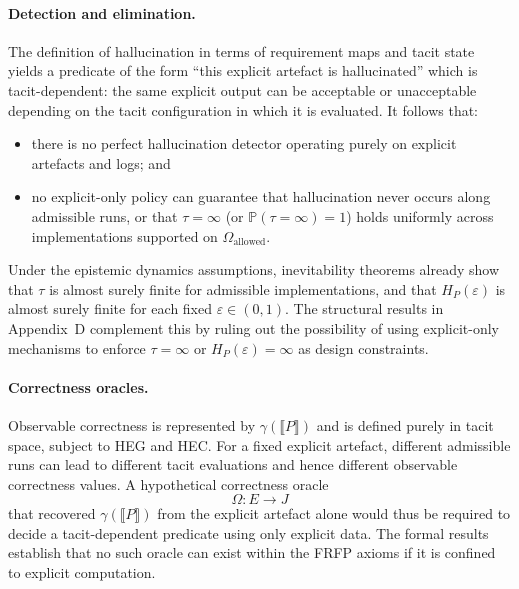\paragraph{Detection and elimination.}
The definition of hallucination in terms of requirement maps and tacit state yields a predicate of the form ``this explicit artefact is hallucinated'' which is tacit-dependent: the same explicit output can be acceptable or unacceptable depending on the tacit configuration in which it is evaluated. It follows that:
\begin{itemize}
  \item there is no perfect hallucination detector operating purely on explicit artefacts and logs; and
  \item no explicit-only policy can guarantee that hallucination never occurs along admissible runs, or that $\tau = \infty$ (or $\mathbb{P}(\tau = \infty) = 1$) holds uniformly across implementations supported on $\Omega_{\mathrm{allowed}}$.
\end{itemize}
Under the epistemic dynamics assumptions, inevitability theorems already show that $\tau$ is almost surely finite for admissible implementations, and that $H_P(\varepsilon)$ is almost surely finite for each fixed $\varepsilon \in (0,1)$. The structural results in Appendix~D complement this by ruling out the possibility of using explicit-only mechanisms to enforce $\tau = \infty$ or $H_P(\varepsilon) = \infty$ as design constraints.

\paragraph{Correctness oracles.}
Observable correctness is represented by $\gamma(\llbracket P \rrbracket)$ and is defined purely in tacit space, subject to HEG and HEC. For a fixed explicit artefact, different admissible runs can lead to different tacit evaluations and hence different observable correctness values. A hypothetical correctness oracle
\[
  \Omega : E \longrightarrow J
\]
that recovered $\gamma(\llbracket P \rrbracket)$ from the explicit artefact alone would thus be required to decide a tacit-dependent predicate using only explicit data. The formal results establish that no such oracle can exist within the FRFP axioms if it is confined to explicit computation.


